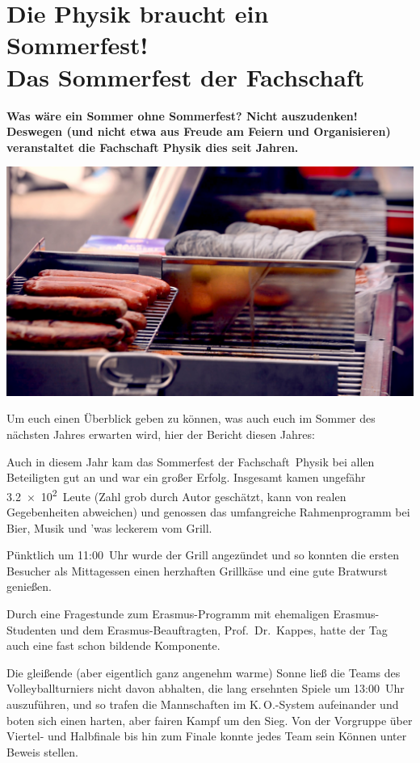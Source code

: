 \section[Das Sommerfest der Fachschaft]{Die Physik braucht ein Sommerfest!\\Das Sommerfest der Fachschaft}
\begin{multicols*}{2}

\textbf{Was wäre ein Sommer ohne Sommerfest?
	Nicht auszudenken!
	Deswegen (und nicht etwa aus Freude am Feiern und Organisieren) veranstaltet die Fachschaft Physik dies seit Jahren.}

\includegraphics[width=\columnwidth]{res/sommerfest_grill.png}

Um euch einen Überblick geben zu können, was auch euch im Sommer des nächsten Jahres erwarten wird, hier der Bericht diesen Jahres:

Auch in diesem Jahr kam das Sommerfest der Fachschaft~Physik bei allen Beteiligten gut an und war ein großer Erfolg.
Insgesamt kamen ungefähr \num{3,2e2}~Leute (Zahl grob durch Autor geschätzt, kann von realen Gegebenheiten abweichen) und genossen das umfangreiche Rahmenprogramm bei Bier, Musik und 'was leckerem vom Grill.

Pünktlich um 11:00~Uhr wurde der Grill angezündet und so konnten die ersten Besucher als Mittagessen einen herzhaften Grillkäse und eine gute Bratwurst genießen.

Durch eine Fragestunde zum Erasmus-Programm mit ehemaligen Erasmus-Studenten und dem Erasmus-Beauftragten, Prof.\ Dr.\ Kappes, hatte der Tag auch eine fast schon bildende Komponente.

Die gleißende (aber eigentlich ganz angenehm warme) Sonne ließ die Teams des Volleyballturniers nicht davon abhalten, die lang ersehnten Spiele um 13:00~Uhr auszuführen, und so trafen die Mannschaften im K.\,O.-System aufeinander und boten sich einen harten, aber fairen Kampf um den Sieg.
Von der Vorgruppe über Viertel- und Halbfinale bis hin zum Finale konnte jedes Team sein Können unter Beweis stellen.


\end{multicols*}
